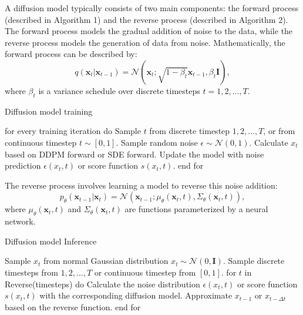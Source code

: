 \documentclass[11pt,a4paper,oneside]{report}
\begin{document}
A diffusion model typically consists of two main components: the forward process (described in Algorithm 1) and the reverse process (described in Algorithm 2). The forward process models the gradual addition of noise to the data, while the reverse process models the generation of data from noise. Mathematically, the forward process can be described by:
\begin{equation}
q(\mathbf{x}_t | \mathbf{x}_{t-1}) = \mathcal{N}(\mathbf{x}_t; \sqrt{1-\beta_t} \mathbf{x}_{t-1}, \beta_t \mathbf{I}),
\end{equation}
where $\beta_t$ is a variance schedule over discrete timesteps $t = 1, 2, ..., T$. 

\begin{algorithm}
\caption{Diffusion model training \cite{bie2023renaissance}}
\begin{algorithmic}[1]
\STATE for every training iteration do
\STATE \hspace{\algorithmicindent} Sample $t$ from discrete timestep $1, 2, \ldots, T$, or from continuous timestep $t \sim [0, 1]$.
\STATE \hspace{\algorithmicindent} Sample random noise $\epsilon \sim \mathcal{N}(0, 1)$.
\STATE \hspace{\algorithmicindent} Calculate $x_t$ based on DDPM forward or SDE forward.
\STATE \hspace{\algorithmicindent} Update the model with noise prediction $\epsilon(x_t, t)$ or score function $s(x_t, t)$.
\STATE end for
\end{algorithmic}
\label{alg:diffusion_model_training}
\end{algorithm}

The reverse process involves learning a model to reverse this noise addition:
\begin{equation}
p_{\theta}(\mathbf{x}_{t-1} | \mathbf{x}_t) = \mathcal{N}(\mathbf{x}_{t-1}; \mu_{\theta}(\mathbf{x}_t, t), \Sigma_{\theta}(\mathbf{x}_t, t)),
\end{equation}
where $\mu_{\theta}(\mathbf{x}_t, t)$ and $\Sigma_{\theta}(\mathbf{x}_t, t)$ are functions parameterized by a neural network.

\begin{algorithm}
\caption{Diffusion model Inference \cite{bie2023renaissance}}
\begin{algorithmic}[1]
\STATE Sample $x_t$ from normal Gaussian distribution $x_t \sim \mathcal{N}(0, \mathbf{I})$.
\STATE Sample discrete timesteps from $1, 2, \ldots, T$ or continuous timestep from $[0,1]$.
\STATE for $t$ in Reverse(timesteps) do
\STATE \hspace{\algorithmicindent} Calculate the noise distribution $\epsilon(x_t, t)$ or score function $s(x_t, t)$ with the corresponding diffusion model.
\STATE \hspace{\algorithmicindent} Approximate $x_{t-1}$ or $x_{t-\Delta t}$ based on the reverse function.
\STATE end for
\end{algorithmic}
\label{alg:diffusion_model_inference}
\end{algorithm}
\end{document}
